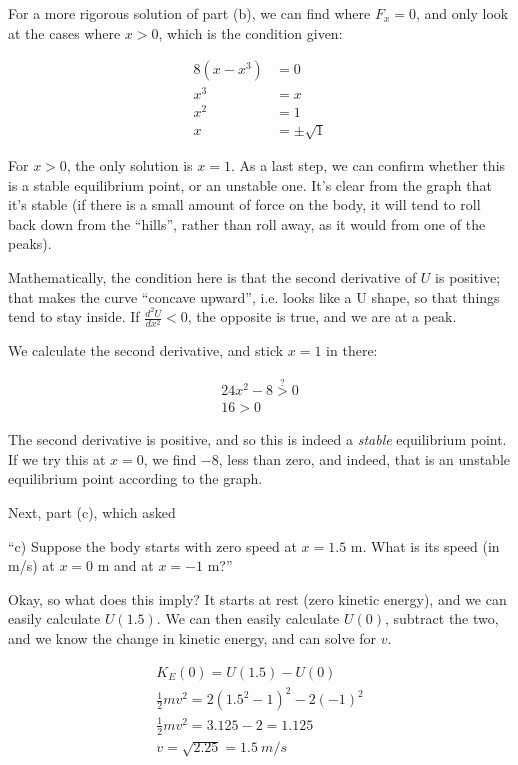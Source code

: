 \documentclass[12pt,a4paper]{report}
\begin{document}
For a more rigorous solution of part (b), we can find where $F_x = 0$, and only look at the cases where $x > 0$, which is the condition given:

\begin{align}
8(x - x^3) &= 0\\
x^3 &= x\\
x^2 &= 1\\
x &= \pm \sqrt{1}
\end{align}

For $x > 0$, the only solution is $x = 1$. As a last step, we can confirm whether this is a stable equilibrium point, or an unstable one. It's clear from the graph that it's stable (if there is a small amount of force on the body, it will tend to roll back down from the ``hills'', rather than roll away, as it would from one of the peaks).

Mathematically, the condition here is that the second derivative of $U$ is positive; that makes the curve ``concave upward'', i.e. looks like a U shape, so that things tend to stay inside. If $\displaystyle \frac{d^2U}{dx^2} < 0$, the opposite is true, and we are at a peak.

We calculate the second derivative, and stick $x = 1$ in there:

\begin{align}
24x^2 - 8 \overset{?}{>} 0\\
16 > 0
\end{align}

The second derivative is positive, and so this is indeed a \emph{stable} equilibrium point. If we try this at $x = 0$, we find $-8$, less than zero, and indeed, that is an unstable equilibrium point according to the graph.

Next, part (c), which asked

``c) Suppose the body starts with zero speed at $x = 1.5$ m. What is its speed (in m/s) at $x = 0$ m and at $x = -1$ m?''

Okay, so what does this imply? It starts at rest (zero kinetic energy), and we can easily calculate $U(1.5)$. We can then easily calculate $U(0)$, subtract the two, and we know the change in kinetic energy, and can solve for $v$.

\begin{align}
K_E(0) = U(1.5) - U(0)\\
\frac{1}{2} m v^2 = 2(1.5^2 - 1)^2 - 2(-1)^2\\
\frac{1}{2} m v^2 = 3.125 - 2 = 1.125\\
v = \sqrt{2.25} = \SI{1.5}{m/s}
\end{align}
\end{document}
